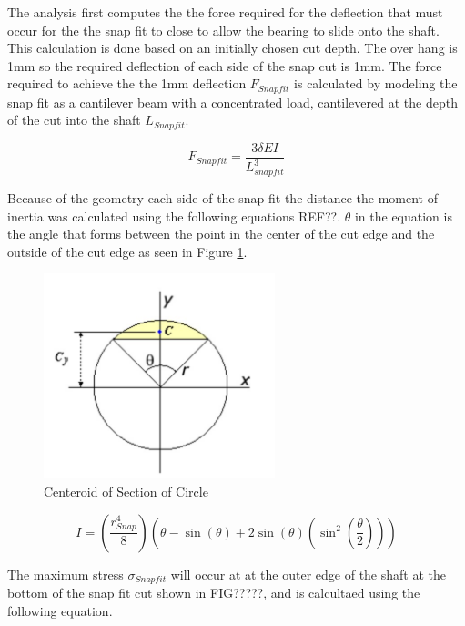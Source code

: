 \documentclass[../main.tex]{subfiles}
\begin{document}
The analysis first computes the the force required for the deflection that must occur for the the snap fit to close to allow the bearing to slide onto the shaft. This calculation is done based on an initially chosen cut depth. The over hang is 1mm so the required deflection of each side of the snap cut is 1mm. The force required to achieve the the 1mm deflection $F_{Snapfit}$ is calculated by modeling the snap fit as a cantilever beam with a concentrated load, cantilevered at the depth of the cut into the shaft $L_{Snapfit}$. 

\begin{equation}
\label{eqn:Fsnap}
F_{Snapfit} = \frac{3 \delta E I}{L_{snapfit}^3}
\end{equation}

Because of the geometry each side of the snap fit the distance the moment of inertia was calculated using the following equations REF??. $\theta$ in the equation is the angle that forms between the point in the center of the cut edge and the outside of the cut edge as seen in Figure \ref{fig:circleSection}.
\begin{figure}[H]
	\centering
	\includegraphics[width=0.6\textwidth]{img/Gondola/circleSectionGeometry.jpg}
	\caption{Centeroid of Section of Circle \cite{circlesection}}
	\label{fig:circleSection}
\end{figure}

\begin{equation}
\label{eqn:Isnap}
I = \left(\frac{r_{Snap}^4}{8}\right)  \left(\theta -\sin(\theta)+2\sin(\theta)(\sin^2\left(\frac{\theta}{2}\right))\right)
\end{equation}

The maximum stress $\sigma_{Snapfit}$ will occur at at the outer edge of the shaft at the bottom of the snap fit cut shown in FIG?????, and is calcultaed using the following equation.
\end{document}
